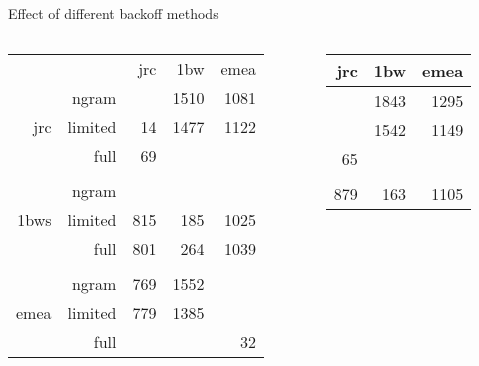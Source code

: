 \documentclass{beamer}
\begin{document}
\begin{frame}
    \begin{block}{Effect of different backoff methods}
        {\small
        \begin{columns}[T,totalwidth=\textwidth]
            \begin{column}{0.425\textwidth}
                \begin{tabular}{rrrrr}
                                          &       & jrc & 1bw  & emea \\ \cline{3-5}
                    \multirow{3}{*}{jrc}  & ngram & \cellcolor{green!25}{13}  & 1510 & 1081 \\
                                          & limited& 14  & 1477 & 1122 \\
                                          & full   & 69  & \cellcolor{green!25}{1195} & \cellcolor{green!25}{961}  \\
         &&&& \\
                    \multirow{3}{*}{1bws} & ngram & \cellcolor{green!25}{768} & \cellcolor{green!25}{158}  & \cellcolor{green!25}{946}  \\
                                          & limited& 815 & 185  & 1025 \\
                                          & full   & 801 & 264  & 1039 \\ 
         &&&& \\ 
                    \multirow{3}{*}{emea} & ngram & 769 & 1552 & \cellcolor{green!25}{4}    \\   
                                          & limited& 779 & 1385 & \cellcolor{green!25}{4}    \\
                                          & full   & \cellcolor{green!25}{600} & \cellcolor{green!25}{1143} & 32
                \end{tabular}
            \end{column}
            \begin{column}{0.425\textwidth}
                \begin{tabular}{rrr}
                    jrc & 1bw  & emea \\ \hline
                    \cellcolor{green!25}{13}  & 1843 & 1295 \\
                    \cellcolor{green!25}{13}  & 1542 & 1149 \\
                    65  & \cellcolor{green!25}{1195} & \cellcolor{green!25}{939}  \\
         && \\
                    879 & 163  & 1105 \\

\end{tabular}
\end{column}
\end{columns}}
\end{block}
\end{frame}
\end{document}
